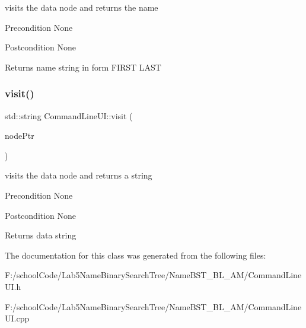 visits the data node and returns the name \begin{DoxyPrecond}{Precondition}
None 
\end{DoxyPrecond}
\begin{DoxyPostcond}{Postcondition}
None 
\end{DoxyPostcond}
\begin{DoxyReturn}{Returns}
name string in form F\+I\+R\+ST L\+A\+ST 
\end{DoxyReturn}
\mbox{\label{class_command_line_u_i_ad57eb91d3410757e96b2a69194def99a}} 
\subsubsection{\texorpdfstring{visit()}{visit()}}
{\footnotesize\ttfamily std\+::string Command\+Line\+U\+I\+::visit (\begin{DoxyParamCaption}\item[{\hyperlink{class_node_main}{Node\+Main} $\ast$}]{node\+Ptr }\end{DoxyParamCaption})\hspace{0.3cm}{\ttfamily [static]}}

visits the data node and returns a string \begin{DoxyPrecond}{Precondition}
None 
\end{DoxyPrecond}
\begin{DoxyPostcond}{Postcondition}
None 
\end{DoxyPostcond}
\begin{DoxyReturn}{Returns}
data string 
\end{DoxyReturn}


The documentation for this class was generated from the following files\+:\begin{DoxyCompactItemize}
\item 
F\+:/school\+Code/\+Lab5\+Name\+Binary\+Search\+Tree/\+Name\+B\+S\+T\+\_\+\+B\+L\+\_\+\+A\+M/Command\+Line\+U\+I.\+h\item 
F\+:/school\+Code/\+Lab5\+Name\+Binary\+Search\+Tree/\+Name\+B\+S\+T\+\_\+\+B\+L\+\_\+\+A\+M/Command\+Line\+U\+I.\+cpp\end{DoxyCompactItemize}
